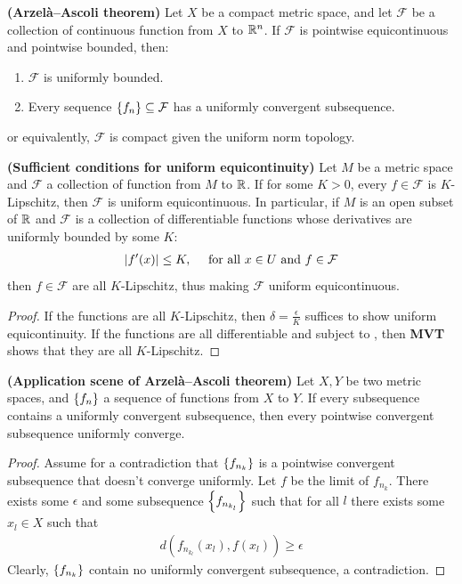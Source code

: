 \documentclass{report}
\begin{document}
\begin{theorem}
\label{THaat}
\textbf{(Arzelà–Ascoli theorem)} Let $X$ be a compact metric space, and let $\mathcal{F}$ be a collection of continuous function from $X$ to $\mathbb{R}^n$. If $\mathcal{F}$ is pointwise equicontinuous and pointwise bounded, then:  
\begin{enumerate}[label=(\Roman*)]
  \item $\mathcal{F}$ is uniformly bounded. 
  \item  Every sequence  $\left\{ f_n \right\} \subseteq \mathcal{F}$ has a uniformly convergent subsequence.  
\end{enumerate}
or equivalently, $\mathcal{F}$ is compact given the uniform norm topology. 
\end{theorem}
\begin{theorem}
\label{THscfue}
\textbf{(Sufficient conditions for uniform equicontinuity)} Let $M$ be a metric space and  $\mathcal{F}$ a collection of function from $M$ to $\mathbb{R}$. If  for some $K>0$, every $f \in \mathcal{F}$ is $K$-Lipschitz, then $\mathcal{F}$ is uniform equicontinuous. In particular, if $M$ is an open subset of $\mathbb{R}$ and  $\mathcal{F}$ is a collection of differentiable functions whose derivatives are uniformly bounded by some $K$:  
\begin{align}
\label{EQf'xk}
\left|f'(x)\right| \leq K,\quad \text{ for all }x\in U\text{ and }f \in \mathcal{F} 
\end{align}
then $f\in \mathcal{F}$ are all $K$-Lipschitz, thus making $\mathcal{F}$ uniform equicontinuous. 
\end{theorem}
\begin{proof}
If the functions are all $K$-Lipschitz, then  $\delta =\frac{\epsilon}{K}$ suffices to show uniform equicontinuity. If the functions are all differentiable and subject to , then \textbf{MVT} shows that they are all $K$-Lipschitz.  
\end{proof}
\begin{theorem}
\label{THasoaat}
\textbf{(Application scene of Arzelà–Ascoli theorem)} Let $X,Y$ be two metric spaces, and $\left\{ f_n \right\}$ a sequence of functions from $X$ to $Y$. If every subsequence contains a uniformly convergent subsequence, then every pointwise convergent subsequence uniformly converge.  
\end{theorem}
\begin{proof}
Assume for a contradiction that $\left\{ f_{n_k} \right\}$ is a pointwise convergent subsequence that doesn't converge uniformly. Let $f$ be the limit of $f_{n_k}$.  There exists some $\epsilon $ and some subsequence $\left\{ f_{n_{k_l}} \right\}$ such that for all $l$ there exists some  $x_l \in X$ such that 
\begin{align*}
d\left(f_{n_{k_l}}(x_l),f(x_l) \right) \geq \epsilon 
\end{align*}
Clearly, $\left\{ f_{n_k} \right\}$ contain no uniformly convergent subsequence, a contradiction. 
\end{proof}
\end{document}
